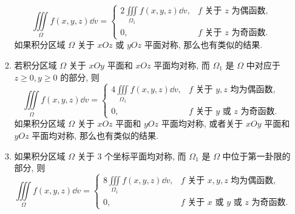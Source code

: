 \begin{theorem}[重积分的对称性]
\begin{enumerate}[label=(\arabic{*})]
\begin{enumerate}[label=(\roman{*})]
                        $$\iiint\limits_{\Omega} f(x, y, z) \dd  v=\begin{cases}
                                2 \displaystyle\iiint\limits_{\Omega_{1}} f(x, y, z) \dd  v, & f \text { 关于 } z \text { 为偶函数, } \\
                                0,                                                           & f \text { 关于 } z \text { 为奇函数. }
                            \end{cases}$$
                        如果积分区域 $ \Omega $ 关于 $ x O z $ 或 $ y O z $ 平面对称, 那么也有类似的结果.
                  \item 若积分区域 $ \Omega $ 关于 $ x O y $ 平面和 $ x O z $ 平面均对称, 而 $ \Omega_{1} $ 是 $ \Omega $ 中对应于 $ z \geqslant 0 ,  y \geqslant 0 $ 的部分, 则
                        $$\iiint\limits_{\Omega} f(x, y, z) \dd  v=\begin{cases}
                                4 \displaystyle\iiint\limits_{\Omega_{1}} f(x, y, z) \dd  v, & f \text { 关于 } y, z \text { 均为偶函数, }           \\
                                0,                                                           & f \text { 关于 } y \text { 或 } z \text { 为奇函数. }
                            \end{cases}$$
                        如果积分区域 $ \Omega $ 关于 $ x O z $ 平面和 $ y O z $ 平面均对称, 或者关于 $ x O y $ 平面和 $ y O z $ 平面均对称, 那么也有类似的结果.
                  \item 如果积分区域 $ \Omega $ 关于 $3$ 个坐标平面均对称, 而 $ \Omega_{1} $ 是 $ \Omega $ 中位于第一卦限的部分, 则
                        $$\iiint\limits_{\Omega} f(x, y, z) \dd  v=\begin{cases}
                                8 \displaystyle\iiint\limits_{\Omega_{1}} f(x, y, z) \dd  v, & f \text { 关于 } x, y, z \text { 均为偶函数, }                       \\
                                0,                                                           & f \text { 关于 } x \text { 或 } y \text { 或 } z \text { 为奇函数. }
                            \end{cases}$$
              \end{enumerate}
    \end{enumerate}
\end{theorem}

